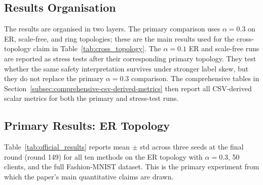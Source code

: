 \documentclass[conference]{IEEEtran}
\begin{document}
\subsection{Results Organisation}
\label{subsec:results-organisation}

The results are organised in two layers. The primary comparison uses $\alpha=0.3$ on ER, scale-free, and ring topologies; these are the main results used for the cross-topology claim in Table~\ref{tab:cross_topology}. The $\alpha=0.1$ ER and scale-free runs are reported as stress tests after their corresponding primary topology. They test whether the same safety interpretation survives under stronger label skew, but they do not replace the primary $\alpha=0.3$ comparison. The comprehensive tables in Section~\ref{subsec:comprehensive-csv-derived-metrics} then report all CSV-derived scalar metrics for both the primary and stress-test runs.

\subsection{Primary Results: ER Topology}
\label{subsec:results-official}

Table~\ref{tab:official_results} reports mean $\pm$ std across three seeds at the final round (round 149) for all ten methods on the ER topology with $\alpha=0.3$, 50 clients, and the full Fashion-MNIST dataset. This is the primary experiment from which the paper's main quantitative claims are drawn.
\end{document}
